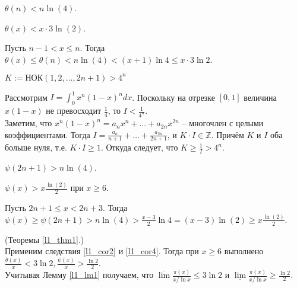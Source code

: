 \begin{corollary} \label{l1_cor1}
    $\theta(n) < n \ln(4)$.
\end{corollary}

\begin{corollary} \label{l1_cor2}
    $\theta(x) < x \cdot 3 \ln(2)$.
\end{corollary}
\begin{pf}
    Пусть $n - 1 < x \leq n$. Тогда $\theta(x) \leq \theta(n) < n \ln(4) < (x + 1) \ln 4 \leq x \cdot 3\ln 2$.
\end{pf}

\begin{lemma} \label{l1_lm3}
    $K := \text{НОК}\left( 1, 2, \ldots, 2n + 1 \right) > 4^n$
\end{lemma}
\begin{pf}
    Рассмотрим $\displaystyle I = \int_{0}^{1} x^n (1 - x)^n dx$. Поскольку на отрезке $[0, 1]$ величина $x(1 - x)$ не превосходит $\displaystyle \frac{1}{4}$, то $\displaystyle I < \frac{1}{4^n}$.\\
    Заметим, что $x^n(1 - x)^n = a_n  x^n + \ldots + a_{2n} x^{2n}$ -- многочлен с целыми коэффициентами. Тогда $\displaystyle I = \frac{a_n}{n + 1} + \ldots + \frac{a_{2n}}{2n + 1}$, и $K \cdot I \in \mathbb{Z}$. Причём $K$ и $I$ оба больше нуля, т.е. $K \cdot I \geq 1$. Откуда следует, что $\displaystyle K \geq \frac{1}{I} > 4^n$.
\end{pf}

\begin{corollary} \label{l1_cor3}
    $\psi(2n+1) > n \ln(4)$.
\end{corollary}

\begin{corollary} \label{l1_cor4}
    $\psi(x) > x \frac{\ln(2)}{2}$ при $x \geq 6$.
\end{corollary}
\begin{pf}
    Пусть $2n+1 \leq x < 2n+3$. Тогда 
    $\displaystyle \psi(x) \geq \psi(2n+1) > n \ln(4) > \frac{x - 3}{2} \ln 4 = (x-3) \ln(2) \geq x \frac{\ln(2)}{2}$.
\end{pf}

\begin{pf} (Теоремы \ref{l1_thm1}.)~\\
    Применим следствия \ref{l1_cor2} и \ref{l1_cor4}. Тогда при $x \geq 6$ выполнено
	$\displaystyle  \frac{\theta(x)}{x} < 3 \ln 2, \frac{\psi(x)}{x} > \frac{\ln 2}{2}$.\\
    Учитывая Лемму \ref{l1_lm1} получаем, что $\displaystyle \overline{\lim} \frac{\pi(x)}{x / \ln x} \leq 3 \ln 2$ и 
    $\displaystyle \underline{\lim} \frac{\pi(x)}{x / \ln x} \geq \frac{\ln 2}{2}$.
\end{pf}

